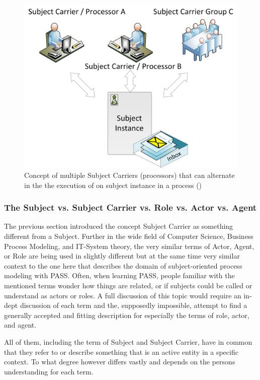 \begin{figure}[htbp]
	\centering
	\includegraphics[width=0.6\linewidth]{Figures/SubjectCarrierConcept2.png}
	\caption[Concept of multiple Subject Carriers (processors) that can alternate in the the execution of on subject instance in a process (\cite{elstermann:diss})]{Concept of multiple Subject Carriers (processors) that can alternate in the the execution of on subject instance in a process (\cite{elstermann:diss})}
	\label{fig:subjectCarrierConcept2}
\end{figure}

\subsubsection{The Subject vs. Subject Carrier vs. Role vs. Actor vs. Agent}
\label{sec:discussionSubjectRoleAgent}


The previous section introduced the concept Subject Carrier as something different from a Subject. Further in the wide field of Computer Science, Business Process Modeling, and IT-System theory, the very similar terms of Actor, Agent, or Role are being used in slightly different but at the same time very similar context to the one here that describes the domain of subject-oriented process modeling with PASS. Often, when learning PASS, people familiar with the mentioned terms wonder how things are related, or if subjects could be called or understand as actors or roles. 
A full discussion of this topic would require an in-dept discussion of each term and the, supposedly impossible, attempt to find a generally accepted and fitting description for especially the terms of role, actor, and agent. 

All of them, including the term of Subject and Subject Carrier, have in common that they refer to or describe something that is an active entity in a specific context. To what degree however differs vastly and depends on the persons understanding for each term. 

